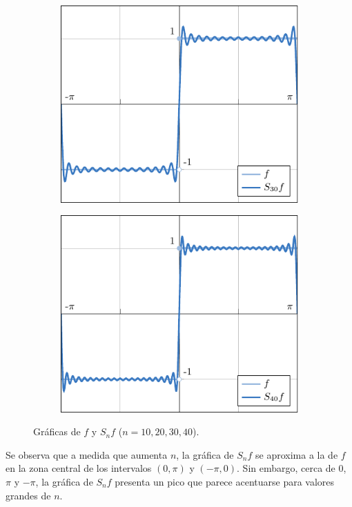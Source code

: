 \documentclass[a4paper, 12pt]{book}
\begin{document}
\begin{figure}[H]
\begin{subfigure}[b]{0.49\textwidth}
    \includegraphics{./plot3/main.pdf}
\end{subfigure}
\begin{subfigure}[b]{0.49\textwidth}
    \centering
    \includegraphics{./plot4/main.pdf}
\end{subfigure}
\caption{Gráficas de $f$ y $S_nf$ ($n = 10,20,30,40$).}
\end{figure}

Se observa que a medida que aumenta $n$, la gráfica de $S_nf$ se aproxima a la de $f$ en la zona central de los intervalos $(0,\pi)$ y $(-\pi,0)$. Sin embargo, cerca de $0$, $\pi$ y $-\pi$, la gráfica de $S_nf$ presenta un pico que parece acentuarse para valores grandes de $n$.
\end{document}
